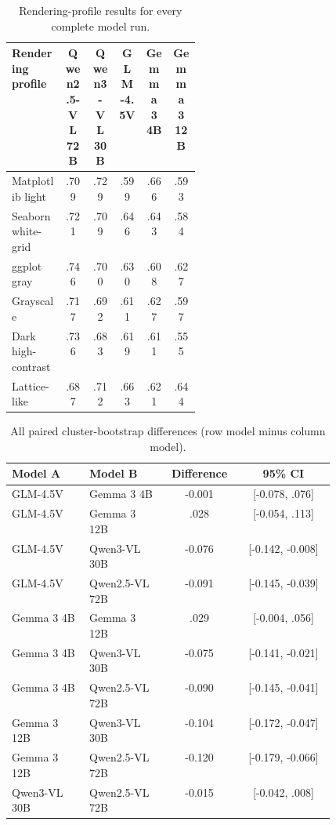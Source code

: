 \begin{table}[H]
\centering
\scriptsize
\caption{Rendering-profile results for every complete model run.}
\label{tab:supp-style}
\begin{tabular}{p{0.28\linewidth}ccccc}
\toprule
Rendering profile & Qwen2.5-VL 72B & Qwen3-VL 30B & GLM-4.5V & Gemma 3 4B & Gemma 3 12B \\
\midrule
Matplotlib light & .709 & .729 & .599 & .666 & .593 \\
Seaborn white-grid & .721 & .709 & .646 & .643 & .584 \\
ggplot gray & .746 & .700 & .630 & .608 & .627 \\
Grayscale & .717 & .692 & .611 & .627 & .597 \\
Dark high-contrast & .736 & .683 & .619 & .611 & .555 \\
Lattice-like & .687 & .712 & .663 & .621 & .644 \\
\bottomrule
\end{tabular}
\end{table}

\begin{table}[H]
\centering
\scriptsize
\caption{All paired cluster-bootstrap differences (row model minus column model).}
\label{tab:supp-pairs}
\begin{tabular}{p{0.24\linewidth}p{0.24\linewidth}cc}
\toprule
Model A & Model B & Difference & 95\% CI \\
\midrule
GLM-4.5V & Gemma 3 4B & -0.001 & [-0.078, .076] \\
GLM-4.5V & Gemma 3 12B & .028 & [-0.054, .113] \\
GLM-4.5V & Qwen3-VL 30B & -0.076 & [-0.142, -0.008] \\
GLM-4.5V & Qwen2.5-VL 72B & -0.091 & [-0.145, -0.039] \\
Gemma 3 4B & Gemma 3 12B & .029 & [-0.004, .056] \\
Gemma 3 4B & Qwen3-VL 30B & -0.075 & [-0.141, -0.021] \\
Gemma 3 4B & Qwen2.5-VL 72B & -0.090 & [-0.145, -0.041] \\
Gemma 3 12B & Qwen3-VL 30B & -0.104 & [-0.172, -0.047] \\
Gemma 3 12B & Qwen2.5-VL 72B & -0.120 & [-0.179, -0.066] \\
Qwen3-VL 30B & Qwen2.5-VL 72B & -0.015 & [-0.042, .008] \\
\bottomrule
\end{tabular}
\end{table}
